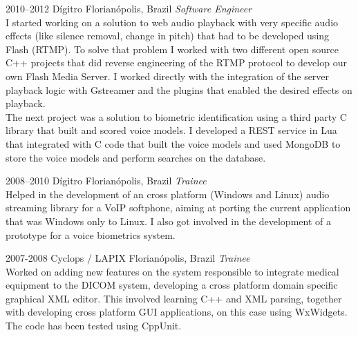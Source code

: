 \documentclass[]{friggeri-cv} %
\begin{document}
\begin{entrylist}
\entry
{2010--2012}
{Dígitro}
{Florianópolis, Brazil}
{\emph{Software Engineer} \\

I started working on a solution to web audio playback
with very specific audio effects (like silence removal,
change in pitch) that had to be developed using Flash (RTMP).
To solve that problem I worked with
two different open source C++ projects that did reverse
engineering of the RTMP protocol to develop our own
Flash Media Server. I worked directly with the integration
of the server playback logic with Gstreamer and the plugins
that enabled the desired effects on playback. \\

The next project was a solution to biometric identification
using a third party C library that built and scored voice models.
I developed a REST service in Lua that integrated with C code
that built the voice models and used MongoDB to store the
voice models and perform searches on the database. \\
}
\end{entrylist}
\begin{entrylist}
\entry
{2008--2010}
{Dígitro}
{Florianópolis, Brazil}
{\emph{Trainee} \\

Helped in the development of an
cross platform (Windows and Linux) audio streaming
library for a VoIP softphone, aiming at porting
the current application that was Windows only to Linux. I also
got involved in the development of a prototype for a voice
biometrics system.
}
\end{entrylist}
\begin{entrylist}
\entry
{2007-2008}
{Cyclops / LAPIX}
{Florianópolis, Brazil}
{\emph{Trainee} \\

Worked on adding new features on the system responsible to
integrate medical equipment to the DICOM system, developing a
cross platform domain specific graphical XML editor.
This involved learning C++ and XML parsing, together with
developing cross platform GUI applications, on this case
using WxWidgets. The code has been tested using CppUnit.
}
\end{entrylist}

\end{document}
